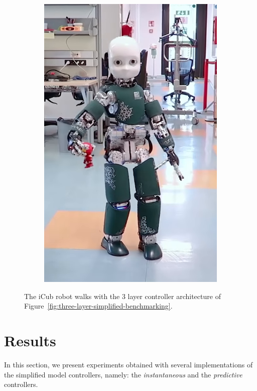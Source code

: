 \begin{figure}[t]
\begin{subfigure}[b]{0.32\textwidth}
        \includegraphics[width=\columnwidth]{chapter_simplified_benchmarking/figures/step3.png}
    \end{subfigure}
    \caption{The iCub robot walks with the 3 layer controller architecture of Figure~\ref{fig:three-layer-simplified-benchmarking}.}
    \label{fig:icub_walking_simplified}
\end{figure}

\section{Results}
\label{sec:results_simplified_benchmarking}
In this section, we present experiments obtained with several implementations of the simplified model controllers, namely: the \emph{instantaneous} and the \emph{predictive} controllers.

